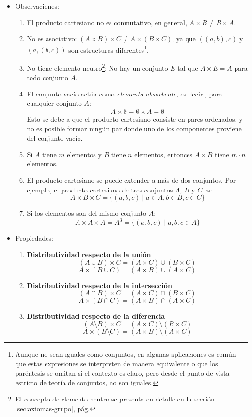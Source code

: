 \begin{itemize}
	\item Observaciones:
	
	\begin{enumerate}
		\item El producto cartesiano no es conmutativo, en general, \(A \times B \neq B \times A\).
		\item No es asociativo: \( (A \times B) \times C \neq A \times (B \times C) \), ya que $((a, b), c)$ y $(a, (b, c))$ son estructuras diferentes\footnote{Aunque no sean iguales como conjuntos, en algunas aplicaciones es común que estas expresiones se interpreten de manera equivalente o que los paréntesis se omitan si el contexto es claro, pero desde el punto de vista estricto de teoría de conjuntos, no son iguales.}.
		\item No tiene elemento neutro\footnote{El concepto de elemento neutro se presenta en detalle en la sección \ref{sec:axiomas-grupo}, pág. \pageref{sec:axiomas-grupo}}: No hay un conjunto $E$ tal que $A \times E = A$ para todo conjunto $A$.
		\item El conjunto vacío actúa como \textit{elemento absorbente}, es decir	, para cualquier conjunto $A$:
		\[ A \times \emptyset = \emptyset \times A = \emptyset \]
		Esto se debe a que el producto cartesiano consiste en pares ordenados, y no es posible formar ningún par donde uno de los componentes proviene del conjunto vacío.
		\item Si \(A\) tiene \(m\) elementos y \(B\) tiene \(n\) elementos, entonces \(A \times B\) tiene \(m \cdot n\) elementos.
		\item El producto cartesiano se puede extender a más de dos conjuntos. Por ejemplo, el producto cartesiano de tres conjuntos \(A\), \(B\) y \(C\) es:
		$$A \times B \times C = \{(a, b, c) \mid a \in A, b \in B, c \in C\}$$
		\item Si los elementos son del mismo conjunto $A$:
		\[ A \times A \times A = A^3 = \{(a, b, c) \mid a, b, c \in A\} \]
	\end{enumerate}
	
	\item Propiedades:
	\begin{enumerate}[label=\roman*)]
		\item \textbf{Distributividad respecto de la unión}
		\[ \left( A \cup B \right) \times C = \left( A \times C \right) \cup \left( B \times C \right) \]
		\[ A \times (B \cup C) = (A \times B) \cup (A \times C) \]
		\item \textbf{Distributividad respecto de la intersección}
		\[ \left( A \cap B \right) \times C = \left( A \times C \right) \cap \left( B \times C \right) \]
	\[ A \times (B \cap C) = (A \times B) \cap (A \times C) \]
		\item \textbf{Distributividad respecto de la diferencia}
	\[ \left( A \setminus B \right) \times C = \left( A \times C \right) \setminus \left( B \times C \right) \]
	\[ A \times (B \setminus C) = (A \times B) \setminus (A \times C) \]
	\end{enumerate}
\end{itemize}


